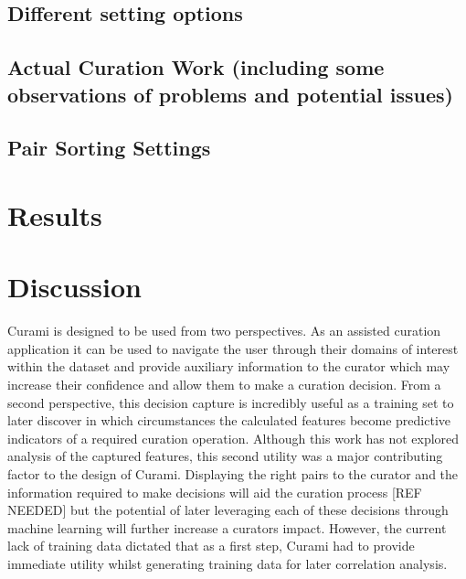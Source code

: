 \documentclass{bmcart}
\begin{document}
\subsection*{Different setting options}

\subsection*{Actual Curation Work (including some observations of problems and potential issues)}
\subsection*{Pair Sorting Settings} \label{pair_sorting_settings}

\section*{Results}




\section*{Discussion}


Curami is designed to be used from two perspectives. As an assisted curation application it can be used to navigate the user through their domains of interest within the dataset and provide auxiliary information to the curator which may increase their confidence and allow them to make a curation decision. From a second perspective, this decision capture is incredibly useful as a training set to later discover in which circumstances the calculated features become predictive indicators of a required curation operation. Although this work has not explored analysis of the captured features, this second utility was a major contributing factor to the design of Curami. Displaying the right pairs to the curator and the information required to make decisions will aid the curation process [REF NEEDED] but the potential of later leveraging each of these decisions through machine learning will further increase a curators impact. However, the current lack of training data dictated that as a first step, Curami had to provide immediate utility whilst generating training data for later correlation analysis.
\end{document}

